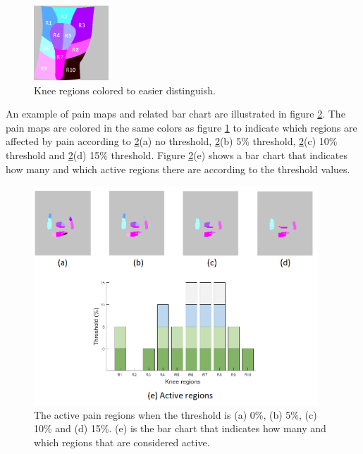 \begin{figure} [H]
\centering
\includegraphics[width=0.25\textwidth]{figures/colorregion}
\caption{Knee regions colored to easier distinguish.}
\label{fig:colorregion}
\end{figure}

\noindent
An example of pain maps and related bar chart are illustrated in figure \ref{fig:threshold}. The pain maps are colored in the same colors as figure \ref{fig:colorregion} to indicate which regions are affected by pain according to \ref{fig:threshold}(a) no threshold, \ref{fig:threshold}(b) 5\% threshold, \ref{fig:threshold}(c) 10\% threshold and \ref{fig:threshold}(d) 15\% threshold. 
Figure \ref{fig:threshold}(e) shows a bar chart that indicates how many and which active regions there are according to the threshold values.

\begin{figure} [H]
\centering
\includegraphics[width=0.95\textwidth]{figures/threshold4}
\caption{The active pain regions when the threshold is (a) 0\%, (b) 5\%, (c) 10\% and (d) 15\%. (e) is the bar chart that indicates how many and which regions that are considered active.}
\label{fig:threshold}
\end{figure}

